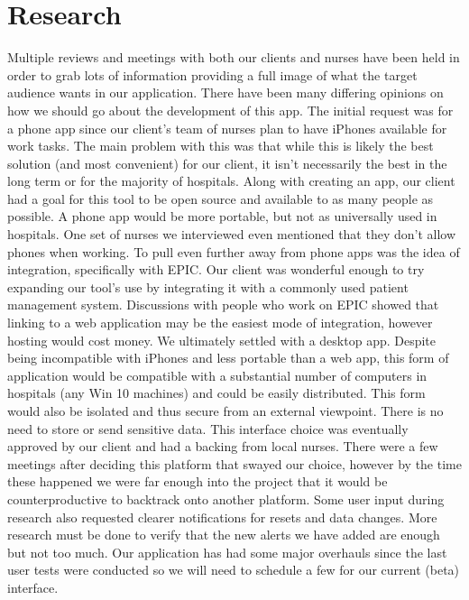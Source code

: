 \documentclass[onecolumn, draftclsnofoot,10pt, compsoc]{IEEEtran}
\begin{document}
\section{Research}
Multiple reviews and meetings with both our clients and nurses have been held in order to grab lots of information providing a full image of what the target audience wants in our application. There have been many differing opinions on how we should go about the development of this app. The initial request was for a phone app since our client's team of nurses plan to have iPhones available for work tasks. The main problem with this was that while this is likely the best solution (and most convenient) for our client, it isn't necessarily the best in the long term or for the majority of hospitals. Along with creating an app, our client had a goal for this tool to be open source and available to as many people as possible. A phone app would be more portable, but not as universally used in hospitals. One set of nurses we interviewed even mentioned that they don't allow phones when working. To pull even further away from phone apps was the idea of integration, specifically with EPIC. Our client was wonderful enough to try expanding our tool's use by integrating it with a commonly used patient management system. Discussions with people who work on EPIC showed that linking to a web application may be the easiest mode of integration, however hosting would cost money. We ultimately settled with a desktop app. Despite being incompatible with iPhones and less portable than a web app, this form of application would be compatible with a substantial number of computers in hospitals (any Win 10 machines) and could be easily distributed. This form would also be isolated and thus secure from an external viewpoint. There is no need to store or send sensitive data. This interface choice was eventually approved by our client and had a backing from local nurses. There were a few meetings after deciding this platform that swayed our choice, however by the time these happened we were far enough into the project that it would be counterproductive to backtrack onto another platform. Some user input during research also requested clearer notifications for resets and data changes. More research must be done to verify that the new alerts we have added are enough but not too much. Our application has had some major overhauls since the last user tests were conducted so we will need to schedule a few for our current (beta) interface. 
\end{document}
